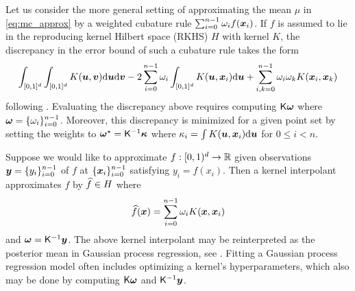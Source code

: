 \documentclass[acmsmall]{acmart}
\begin{document}
\begin{description}
    Let us consider the more general setting of approximating the mean $\mu$ in \eqref{eq:mc_approx} by a weighted cubature rule $\sum_{i=0}^{n-1} \omega_i f({\boldsymbol{x}}_i)$. If $f$ is assumed to lie in the reproducing kernel Hilbert space (RKHS) $H$ with kernel $K$, the discrepancy in the error bound of such a cubature rule takes the form
    $$\int_{[0,1]^d} \int_{[0,1]^d} K({\boldsymbol{u}},{\boldsymbol{v}}) \mathrm{d} {\boldsymbol{u}} \mathrm{d} {\boldsymbol{v}} - 2 \sum_{i=0}^{n-1} \omega_i \int_{[0,1]^d} K({\boldsymbol{u}},{\boldsymbol{x}}_i) \mathrm{d} {\boldsymbol{u}} + \sum_{i,k=0}^{n-1} \omega_i \omega_k K({\boldsymbol{x}}_i,{\boldsymbol{x}}_k)$$
    following \citep{hickernell.generalized_discrepancy_quadrature_error_bound}. Evaluating the discrepancy above requires computing ${\mathsf{K}} {\boldsymbol{\omega}}$ where ${\boldsymbol{\omega}} = \{\omega_i\}_{i=0}^{n-1}$. Moreover, this discrepancy is minimized for a given point set by setting the weights to ${\boldsymbol{\omega}}^\star = {\mathsf{K}}^{-1} {\boldsymbol{\kappa}}$ where $\kappa_i = \int K({\boldsymbol{u}},{\boldsymbol{x}}_i) \mathrm{d} {\boldsymbol{u}}$ for $0 \leq i < n$.
    \item[Kernel Interpolation] Suppose we would like to approximate $f: [0,1)^d \to {\mathbb{R}}$ given observations ${\boldsymbol{y}} = \{y_i\}_{i=0}^{n-1}$ of $f$ at $\{{\boldsymbol{x}}_i\}_{i=0}^{n-1}$ satisfying $y_i = f(x_i)$. Then a kernel interpolant approximates $f$ by ${\widehat{f}} \in H$ where 
    $${\widehat{f}}({\boldsymbol{x}}) = \sum_{i=0}^{n-1} \omega_i K({\boldsymbol{x}},{\boldsymbol{x}}_i)$$
    and ${\boldsymbol{\omega}} = {\mathsf{K}}^{-1} {\boldsymbol{y}}$. The above kernel interpolant may be reinterpreted as the posterior mean in Gaussian process regression, see \citep{rasmussen.gp4ml}. Fitting a Gaussian process regression model often includes optimizing a kernel's hyperparameters, which also may be done by computing  ${\mathsf{K}} {\boldsymbol{\omega}}$ and ${\mathsf{K}}^{-1} {\boldsymbol{y}}$.  %
\end{description}
\end{document}
